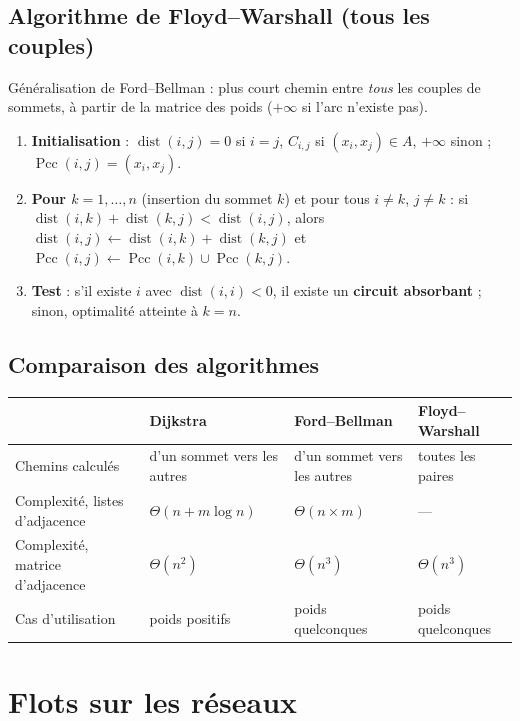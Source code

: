 \documentclass[11pt,a4paper]{article}
\renewcommand{\arraystretch}{1.3}
\newcommand{\Pcc}{\operatorname{Pcc}}
\newcommand{\dist}{\operatorname{dist}}
\begin{document}
\subsection{Algorithme de Floyd--Warshall (tous les couples)}
Généralisation de Ford--Bellman : plus court chemin entre \emph{tous} les couples de sommets, à partir de la matrice des poids ($+\infty$ si l'arc n'existe pas).

\begin{algo}
\begin{enumerate}[nosep]
\item \textbf{Initialisation} : $\dist(i,j)=0$ si $i=j$, $C_{i,j}$ si $(x_i,x_j)\in A$, $+\infty$ sinon ; $\Pcc(i,j)=(x_i,x_j)$.
\item \textbf{Pour $k=1,\dots,n$} (insertion du sommet $k$) et pour tous $i\ne k$, $j\ne k$ : si $\dist(i,k)+\dist(k,j)<\dist(i,j)$, alors
$\dist(i,j)\leftarrow\dist(i,k)+\dist(k,j)$ et $\Pcc(i,j)\leftarrow\Pcc(i,k)\cup\Pcc(k,j)$.
\item \textbf{Test} : s'il existe $i$ avec $\dist(i,i)<0$, il existe un \textbf{circuit absorbant} ; sinon, optimalité atteinte à $k=n$.
\end{enumerate}
\end{algo}

\subsection{Comparaison des algorithmes}
\begin{center}
\small
\renewcommand{\arraystretch}{1.5}
\begin{tabular}{@{}p{3.6cm}p{3.7cm}p{3.7cm}p{3.5cm}@{}}
\toprule
 & \textbf{Dijkstra} & \textbf{Ford--Bellman} & \textbf{Floyd--Warshall}\\
\midrule
Chemins calculés & d'un sommet vers les autres & d'un sommet vers les autres & toutes les paires\\
Complexité, listes d'adjacence & $\Theta(n+m\log n)$ & $\Theta(n\times m)$ & ---\\
Complexité, matrice d'adjacence & $\Theta(n^2)$ & $\Theta(n^3)$ & $\Theta(n^3)$\\
Cas d'utilisation & poids positifs & poids quelconques & poids quelconques\\
\bottomrule
\end{tabular}
\end{center}

\section{Flots sur les réseaux}
\end{document}
